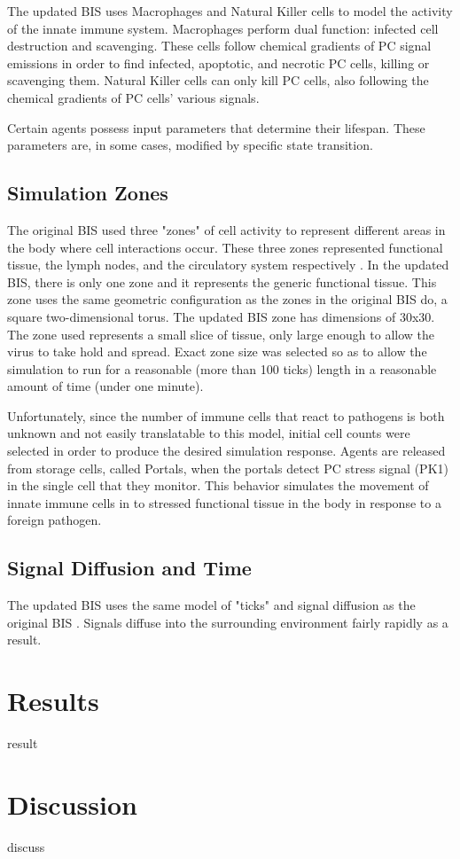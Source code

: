 \documentclass[10pt,conference]{IEEEtran}
\begin{document}
\indent
The updated BIS uses Macrophages and Natural Killer cells to model the activity of the innate immune system. Macrophages perform dual 
function: infected cell destruction and scavenging. These cells follow chemical gradients of PC signal emissions in order to find infected, 
apoptotic, and necrotic PC cells, killing or scavenging them. Natural Killer cells can only kill PC cells, also following the chemical gradients of 
PC cells' various signals.

\indent
Certain agents possess input parameters that determine their lifespan. These parameters are, in some cases, modified by specific state 
transition.

\subsection{Simulation Zones}
The original BIS used three "zones" of cell activity to represent different areas in the body where cell interactions occur. These three zones 
represented functional tissue, the lymph nodes, and the circulatory system respectively \cite{Folcik:2007}. In the updated BIS, there is only 
one zone and it represents the generic functional tissue. This zone uses the same geometric configuration as the zones in the original BIS do, 
a square two-dimensional torus. The updated BIS zone has dimensions of 30x30. The zone used represents a small slice of tissue, only large 
enough to allow the virus to take hold and spread. Exact zone size was selected so as to allow the simulation to run for a reasonable (more than 100 
ticks) length in a reasonable amount of time (under one minute). 

\indent
Unfortunately, since the number of immune cells that react to pathogens is both unknown and not easily translatable to this model, initial cell 
counts were selected in order to produce the desired simulation response. Agents are released from storage cells, called Portals, when the 
portals detect PC stress signal (PK1) in the single cell that they monitor. This behavior simulates the movement of innate immune cells in 
to stressed functional tissue in the body in response to a foreign pathogen.

\subsection{Signal Diffusion and Time}
The updated BIS uses the same model of "ticks" and signal diffusion as the original BIS \cite{Folcik:2007}. Signals diffuse into the surrounding environment fairly rapidly as a result.


\noindent

\section{Results}
\noindent
result

\section{Discussion}
\noindent
discuss



\end{document}
